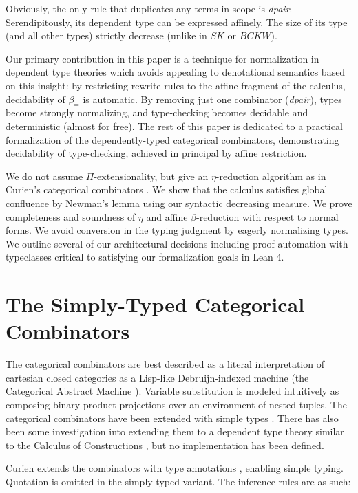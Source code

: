 \documentclass{article}
\begin{document}
Obviously, the only rule that duplicates any terms in scope is \textit{dpair}. Serendipitously, its dependent type can be expressed affinely. The size of its type (and all other types) strictly decrease (unlike in \(SK\) or \(BCKW\)).

Our primary contribution in this paper is a technique for normalization in dependent type theories which avoids appealing to denotational semantics based on this insight: by restricting rewrite rules to the affine fragment of the calculus, decidability of \(\beta_{=}\) is automatic. By removing just one combinator (\textit{dpair}), types become strongly normalizing, and type-checking becomes decidable and deterministic (almost for free). The rest of this paper is dedicated to a practical formalization of the dependently-typed categorical combinators, demonstrating decidability of type-checking, achieved in principal by affine restriction.

We do not assume \(\Pi\)-extensionality, but give an \(\eta\)-reduction algorithm as in Curien's categorical combinators \autocite[p. 221]{CURIEN1986188}. We show that the calculus satisfies global confluence by Newman's lemma \autocite{newman1942theories} using our syntactic decreasing measure. We prove completeness and soundness of \(\eta\) and affine \(\beta\)-reduction with respect to normal forms. We avoid conversion in the typing judgment by eagerly normalizing types. We outline several of our architectural decisions including proof automation with typeclasses critical to satisfying our formalization goals in Lean 4.

\section{The Simply-Typed Categorical Combinators}

The categorical combinators are best described as a literal interpretation of cartesian closed categories as a Lisp-like Debruijn-indexed machine (the Categorical Abstract Machine \autocite{cmachine}). Variable substitution is modeled intuitively as composing binary product projections \autocite[p. 6]{cmachine} over an environment of nested tuples. The categorical combinators have been extended with simple types \autocite{CURIEN1986188}. There has also been some investigation into extending them to a dependent type theory similar to the Calculus of Constructions \autocite{ritter1990categorical}, but no implementation has been defined.

Curien extends the combinators with type annotations \autocite[p. 220]{CURIEN1986188}, enabling simple typing. Quotation is omitted in the simply-typed variant. The inference rules are as such:
\end{document}
